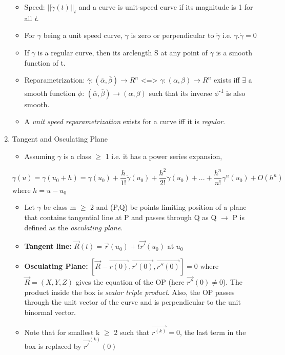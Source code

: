 \documentclass[11pt]{article}
\begin{document}
\begin{enumerate}
\begin{itemize}
\item Speed: \(|| \dot{\gamma}(t) ||_{t}\) and a curve is unit-speed curve if its magnitude is 1 for all \emph{t}.
\item For \(\gamma\) being a unit speed curve, \(\ddot{\gamma}\) is zero or perpendicular to \(\dot{\gamma}\) i.e. \(\ddot{\gamma}.\dot{\gamma}=0\)
\item If \(\gamma\) is a regular curve, then its arclength S at any point of \(\gamma\) is a smooth function of t.
\item Reparametrization: \(\overline{\gamma}:(\overline{\alpha},\overline{\beta}) \rightarrow R^{n}\) <=> \(\gamma: (\alpha,\beta) \rightarrow R^{n}\)  exists iff \(\exists\) a smooth function \(\phi\): \((\overline{\alpha},\overline{\beta}) \rightarrow (\alpha,\beta)\) such that its inverse \(\phi\)\textsuperscript{-1} is also smooth.
\item A \emph{unit speed reparametrization} exists for a curve iff it is \emph{regular}.
\end{itemize}
\item Tangent and Osculating Plane
\label{sec:org6b529cd}
\begin{itemize}
\item Assuming \(\gamma\) is a class \(\ge\) 1 i.e. it has a power series expansion,
\end{itemize}
\[ \gamma(u)=\gamma(u_{0}+h)=\gamma(u_{0})+\frac{h}{1!}\dot{\gamma}(u_{0})+\frac{h^{2}}{2!}\ddot{\gamma}(u_{0})+ ... + \frac{h^{n}}{n!}\gamma^{n}(u_{0})+O(h^{n})
\]
  where \(h = u-u_0\)
\begin{itemize}
\item Let \(\gamma\) be class m \(\ge\) 2 and (P,Q) be points limiting position of a plane that contains tangential line at P and passes through Q as Q \(\rightarrow\) P is defined as the \emph{osculating plane}.
\item \textbf{Tangent line:} \(\vec{R}(t)=\vec{r}(u_{0})+t \vec{r'}(u_{0})\) at \(u_{0}\)
\item \textbf{Osculating Plane:} \([\vec{R}-\vec{r(0)}, \vec{r'(0)}, \vec{r''(0)}]=0\) where \(\vec{R}=(X,Y,Z)\) gives the equation of the OP (here \(\vec{r''}(0)\neq0\)). The product inside the box is \emph{scalar triple product}. Also, the OP passes through the unit vector of the curve and is perpendicular to the unit binormal vector.
\item Note that for smallest k \(\ge\) 2 such that \(\vec{r^{(k)}}=0\), the last term in the box is replaced by \(\vec{r'}^{(k)}(0)\)
\end{itemize}

\end{enumerate}
\end{document}
